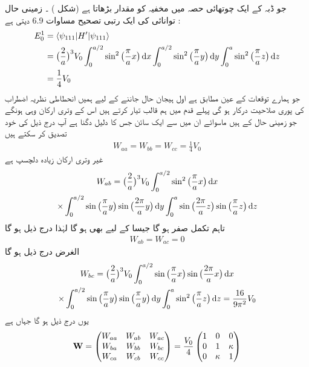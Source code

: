 جو ڈبہ کے ایک چوتھائی  حصہ میں مخفیہ کو  مقدار  بڑھاتا ہے  (شکل )  ۔ زمینی حال توانائی کی ایک رتبی  تصحیح  مساوات 6.9 دیتی ہے :
\begin{align}
E_0^1 &= \langle \psi_{111} | H' | \psi_{111} \rangle\nonumber \\
&= \big (\frac{2}{a} \big )^3 V_0 \int_0^{a/2} \sin^2 \big ( \frac{\pi}{a} x \big ) \dif x \int_0^{a/2} \sin^2 \big ( \frac{\pi}{a} y \big ) \dif y \int_0^a \sin^2 \big ( \frac{\pi}{a} z \big ) \dif z\nonumber \\
&= \frac{1}{4} V_0
\end{align}
جو ہمارے توقعات کے عین مطابق ہے اول ہیجان  حال جاننے کے لیے ہمیں انحطاطی نظریہ اضطراب کی  پوری صلاحیت درکار ہو گی پہلے قدم میں ہم قالب  تیار کرتے ہیں اس کے  وتری ارکان وہی ہونگے جو زمینی حال کے ہیں ماسوائے ان میں سے ایک سائن جس کا دلیل دگنا ہے آپ درج ذیل کی خود تصدیق کر سکتے  ہیں 
\begin{align*}
W_{aa} = W_{bb} = W_{cc} = \frac{1}{4} V_0
\end{align*}
غیر وتری ارکان زیادہ دلچسپ ہے 
\begin{multline*}
W_{ab} = \big ( \frac{2}{a} \big )^3 V_0 \int_0^{a/2} \sin^2 \big ( \frac{\pi}{a} x \big ) \dif x\\
\times \int_0^{a/2} \sin \big (\frac{\pi}{a} y \big ) \sin \big ( \frac{2 \pi}{a} y \big ) \dif y \int_0^a \sin \big ( \frac{2 \pi}{a} z \big ) \sin \big ( \frac{\pi}{a} z \big ) \dif z
\end{multline*}
تاہم  تکمل صفر ہو گا جیسا  کے لیے بھی ہو گا لہٰذا  درج ذیل ہو گا 
\begin{align*}
W_{ab} = W_{ac} = 0
\end{align*}
الغرض  درج ذیل ہو گا 
\begin{multline*}
W_{bc} = \big ( \frac{2}{a} \big )^3 V_0 \int_0^{a/2} \sin \big ( \frac{\pi}{a} x \big ) \sin \big (\frac{2 \pi}{a} x \big ) \dif x\\
\times \int_0^{a/2} \sin \big (\frac{\pi}{a} y \big ) \sin \big ( \frac{\pi}{a} y \big ) \dif y \int_0^a \sin^2 \big ( \frac{\pi}{a} z \big ) \dif z = \frac{16}{9 \pi^2} V_0
\end{multline*}
یوں درج ذیل ہو گا جہاں  ہے
\begin{align}
\bold{W} =
\begin{pmatrix}
W_{aa} & W_{ab} & W_{ac} \\
W_{ba} & W_{bb} & W_{bc} \\
W_{ca} & W_{cb} & W_{cc}
\end{pmatrix}=
 \frac{V_0}{4}
\begin{pmatrix}
1 & 0 & 0 \\
0 & 1 & \kappa \\
0 & \kappa & 1
\end{pmatrix}
\end{align}
